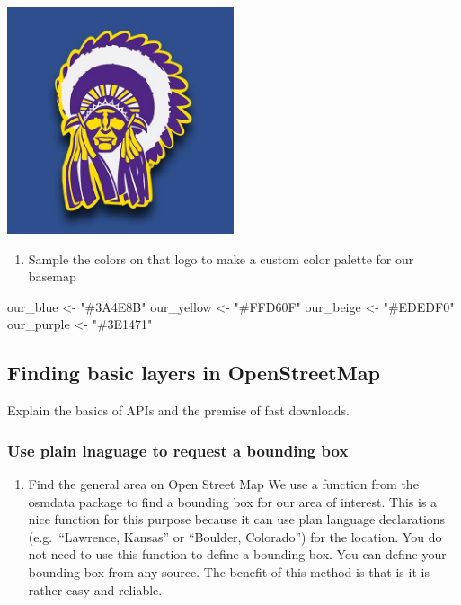 \documentclass[
  paper=a4,
  ,captions=tableheading
]{scrartcl}
\newenvironment{Shaded}{\begin{snugshade}}{\end{snugshade}}
\newcommand{\NormalTok}[1]{#1}
\newcommand{\OtherTok}[1]{\textcolor[rgb]{0.56,0.35,0.01}{#1}}
\newcommand{\StringTok}[1]{\textcolor[rgb]{0.31,0.60,0.02}{#1}}
\providecommand{\tightlist}{%
  \setlength{\itemsep}{0pt}\setlength{\parskip}{0pt}}
\begin{document}
\includegraphics[width=0.5\textwidth,height=\textheight]{Haskell_logo.png}

\begin{enumerate}
\def\labelenumi{\arabic{enumi}.}
\setcounter{enumi}{1}
\tightlist
\item
  Sample the colors on that logo to make a custom color palette for our
  basemap
\end{enumerate}

\begin{Shaded}
\begin{Highlighting}[]
\NormalTok{our\_blue }\OtherTok{\textless{}{-}} \StringTok{"\#3A4E8B"}
\NormalTok{our\_yellow }\OtherTok{\textless{}{-}} \StringTok{"\#FFD60F"}
\NormalTok{our\_beige }\OtherTok{\textless{}{-}} \StringTok{"\#EDEDF0"}
\NormalTok{our\_purple }\OtherTok{\textless{}{-}} \StringTok{"\#3E1471"}
\end{Highlighting}
\end{Shaded}

\hypertarget{finding-basic-layers-in-openstreetmap}{%
\subsection{Finding basic layers in
OpenStreetMap}\label{finding-basic-layers-in-openstreetmap}}

Explain the basics of APIs and the premise of fast downloads.

\hypertarget{use-plain-lnaguage-to-request-a-bounding-box}{%
\subsubsection{Use plain lnaguage to request a bounding
box}\label{use-plain-lnaguage-to-request-a-bounding-box}}

\begin{enumerate}
\def\labelenumi{\arabic{enumi}.}
\tightlist
\item
  Find the general area on Open Street Map We use a function from the
  osmdata package to find a bounding box for our area of interest. This
  is a nice function for this purpose because it can use plan language
  declarations (e.g.~``Lawrence, Kansas'' or ``Boulder, Colorado'') for
  the location. You do not need to use this function to define a
  bounding box. You can define your bounding box from any source. The
  benefit of this method is that is it is rather easy and reliable.
\end{enumerate}
\end{document}
